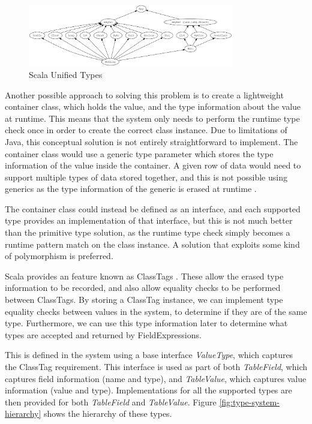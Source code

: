 \begin{figure}[h]
	\centering
	\includegraphics[width=0.8\textwidth]{chapters/diagrams/implementation/unified-types-diagram}
	\caption{Scala Unified Types \protect\cite{scala_unified_types}}
	\label{fig:scala-unified-types}
\end{figure}

Another possible approach to solving this problem is to create a lightweight container class, which holds the value, and the type information about the value at runtime. This means that the system only needs to perform the runtime type check once in order to create the correct class instance. Due to limitations of Java, this conceptual solution is not entirely straightforward to implement. The container class would use a generic type parameter which stores the type information of the value inside the container. A given row of data would need to support multiple types of data stored together, and this is not possible using generics as the type information of the generic is erased at runtime . 

The container class could instead be defined as an interface, and each supported type provides an implementation of that interface, but this is not much better than the primitive type solution, as the runtime type check simply becomes a runtime pattern match on the class instance. A solution that exploits some kind of polymorphism is preferred.

Scala provides an feature known as ClassTags . These allow the erased type information to be recorded, and also allow equality checks to be performed between ClassTags. By storing a ClassTag instance, we can implement type equality checks between values in the system, to determine if they are of the same type. Furthermore, we can use this type information later to determine what types are accepted and returned by FieldExpressions.

This is defined in the system using a base interface \textit{ValueType}, which captures the ClassTag requirement. This interface is used as part of both \textit{TableField}, which captures field information (name and type), and \textit{TableValue}, which captures value information (value and type). Implementations for all the supported types are then provided for both \textit{TableField} and \textit{TableValue}. Figure \ref{fig:type-system-hierarchy} shows the hierarchy of these types. 

